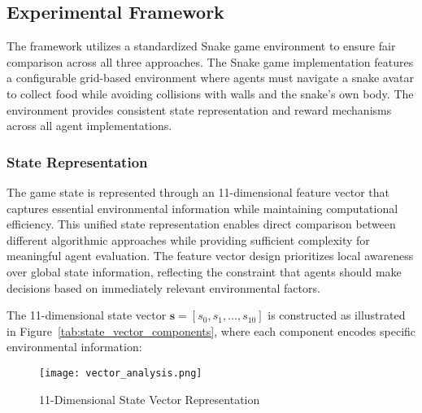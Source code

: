 \documentclass[a4paper,12pt]{article}
\begin{document}
\subsection{Experimental Framework}

The framework utilizes a standardized Snake game environment to ensure fair comparison across all three approaches. The Snake game implementation features a configurable grid-based environment where agents must navigate a snake avatar to collect food while avoiding collisions with walls and the snake's own body. The environment provides consistent state representation and reward mechanisms across all agent implementations.

\subsubsection{State Representation}

The game state is represented through an 11-dimensional feature vector that captures essential environmental information while maintaining computational efficiency. This unified state representation enables direct comparison between different algorithmic approaches while providing sufficient complexity for meaningful agent evaluation. The feature vector design prioritizes local awareness over global state information, reflecting the constraint that agents should make decisions based on immediately relevant environmental factors.

The 11-dimensional state vector $\mathbf{s} = [s_0, s_1, \ldots, s_{10}]$ is constructed as illustrated in Figure~\ref{tab:state_vector_components}, where each component encodes specific environmental information:

\begin{figure}[H]
   \centering
   \texttt{[image: vector\_analysis.png]}
   \caption{11-Dimensional State Vector Representation}
   \label{fig:state_vector}
\end{figure}
\end{document}
